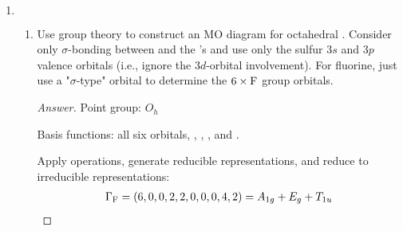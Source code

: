 \documentclass[../psets.tex]{subfiles}
\begin{document}
\begin{enumerate}[label={\Roman*)}]
\begin{enumerate}[label={\alph*)}]
\begin{proof}[Answer]
            We can determine that $\Gamma_\nu=(3,0,1)$ by counting how many $\overrightarrow{\ce{N-H}}$ vectors stay the same under each symmetry operation. We can decompose this by inspection to $\Gamma_\nu=A_1+E$. Thus, we have by subtraction that $\Gamma_\delta=A_1+E$.\par\smallskip
            For planar , we can determine that $\Gamma_{x,y,z}=(3,0,-1,1,-2,1)$. We can also figure out that the number of atoms unmoved after applying each symmetry operation is $(4,1,2,4,1,2)$. Thus, $\Gamma_{3N}=(12,0,-2,4,-2,2)$. We can decompose this by repeated applications of the reduction formula to $\Gamma_{3N}=A_1'+A_2'+3E'+2A_2''+E''$. Since $\Gamma_\text{trans}=E'+A_2''$ and $\Gamma_\text{rot}=A_2'+E''$, we have by subtraction that $\Gamma_\text{vibs}=A_1'+2E'+A_2''$.\par
            We can determine that $\Gamma_\nu=(3,0,1,3,0,1)$ by counting how many $\overrightarrow{\ce{N-H}}$ vectors stay the same under each symmetry operation. We can decompose this by inspection to $\Gamma_\nu=A_1'+E'$. Thus, we have by subtraction that $\Gamma_\delta=E'+A_2''$.\par\medskip
            Since the $E$ pyramidal bending modes transform into the analogous $E'$ planar bending modes, but the $A_1$ pyramidal bending mode has no planar analogue, it is the $A_1$ bending mode in pyramidal  that causes the inversion.
        \end{proof}
    \end{enumerate}
    \newpage
    \item ${\color{white}x}$
    \begin{enumerate}[label={\alph*)}]
        \item Use group theory to construct an MO diagram for octahedral . Consider only $\sigma$-bonding between  and the 's and use only the sulfur $3s$ and $3p$ valence orbitals (i.e., ignore the $3d$-orbital involvement). For fluorine, just use a "$\sigma$-type" orbital to determine the $6\times\ce{F}$ group orbitals.
        \begin{proof}[Answer]
            Point group: $O_h$\par
            Basis functions: all six  orbitals, , , , and .\par
            Apply operations, generate reducible representations, and reduce to irreducible representations:
            \begin{align*}
                \Gamma_{\ce{F}} &= (6,0,0,2,2,0,0,0,4,2) = A_{1g}+E_g+T_{1u}\\

\end{align*}
\end{proof}
\end{enumerate}
\end{enumerate}
\end{document}
